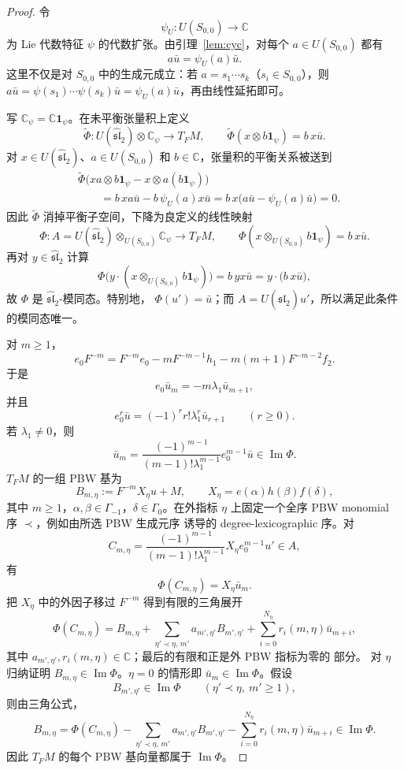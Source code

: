 \documentclass[UTF8,11pt]{ctexart}
\newcommand{\C}{\mathbb C}
\newcommand{\G}{\Gamma}
\newcommand{\slh}{\widehat{\mathfrak{sl}}_2}
\newcommand{\im}{\operatorname{Im}}
\theoremstyle{plain}
\theoremstyle{definition}
\begin{document}
\begin{proof}
令
\[
  \psi_U:U(S_{0,0})\longrightarrow\C
\]
为 Lie 代数特征 \(\psi\) 的代数扩张。由引理~\ref{lem:cyc}，对每个
\(a\in U(S_{0,0})\) 都有
\[
  a\bar u=\psi_U(a)\bar u.
\]
这里不仅是对 \(S_{0,0}\) 中的生成元成立：若
\(a=s_1\cdots s_k\)（\(s_i\in S_{0,0}\)），则
\(a\bar u=\psi(s_1)\cdots\psi(s_k)\bar u=\psi_U(a)\bar u\)，再由线性延拓即可。

写 \(\C_\psi=\C\mathbf 1_\psi\)。在未平衡张量积上定义
\[
  \widetilde\Phi:U(\slh)\otimes\C_\psi\longrightarrow T_FM,
  \qquad
  \widetilde\Phi(x\otimes b\mathbf 1_\psi)=b\,x\bar u.
\]
对 \(x\in U(\slh)\)、\(a\in U(S_{0,0})\) 和 \(b\in\C\)，张量积的平衡关系被送到
\[
\begin{aligned}
  &\widetilde\Phi\bigl(xa\otimes b\mathbf 1_\psi
      -x\otimes a(b\mathbf 1_\psi)\bigr) \\
  &\qquad=b\,xa\bar u-b\,\psi_U(a)x\bar u
   =b\,x\bigl(a\bar u-\psi_U(a)\bar u\bigr)=0.
\end{aligned}
\]
因此 \(\widetilde\Phi\) 消掉平衡子空间，下降为良定义的线性映射
\[
  \Phi:A=U(\slh)\otimes_{U(S_{0,0})}\C_\psi\longrightarrow T_FM,
  \qquad \Phi(x\otimes_{U(S_{0,0})}b\mathbf 1_\psi)=b\,x\bar u.
\]
再对 \(y\in\slh\) 计算
\[
  \Phi\bigl(y\cdot(x\otimes_{U(S_{0,0})}b\mathbf 1_\psi)\bigr)
  =b\,yx\bar u
  =y\cdot\bigl(b\,x\bar u\bigr),
\]
故 \(\Phi\) 是 \(\slh\)-模同态。特别地，
\(\Phi(u')=\bar u\)；而 \(A=U(\slh)u'\)，所以满足此条件的模同态唯一。

对 \(m\ge1\)，
\[
  e_0F^{-m}=F^{-m}e_0-mF^{-m-1}h_1-m(m+1)F^{-m-2}f_2.
\]
于是
\[
  e_0\bar u_m=-m\lambda_1\bar u_{m+1},
\]
并且
\[
  e_0^r\bar u=(-1)^rr!\lambda_1^r\bar u_{r+1}\qquad(r\ge0).
\]
若 \(\lambda_1\ne0\)，则
\[
  \bar u_m=\frac{(-1)^{m-1}}{(m-1)!\lambda_1^{m-1}}e_0^{m-1}\bar u\in\im\Phi.
\]
\(T_FM\) 的一组 PBW 基为
\[
  B_{m,\eta}:=F^{-m}X_\eta u+M,
  \qquad
  X_\eta=e(\alpha)h(\beta)f(\delta),
\]
其中 \(m\ge1\)，\(\alpha,\beta\in\G_{-1}\)，\(\delta\in\G_0\)。在外指标
\(\eta\) 上固定一个全序 PBW monomial 序 \(\prec\)，例如由所选 PBW 生成元序
诱导的 degree-lexicographic 序。对
\[
  C_{m,\eta}=\frac{(-1)^{m-1}}{(m-1)!\lambda_1^{m-1}}X_\eta e_0^{m-1}u'\in A,
\]
有
\[
  \Phi(C_{m,\eta})=X_\eta\bar u_m.
\]
把 \(X_\eta\) 中的外因子移过 \(F^{-m}\) 得到有限的三角展开
\[
  \Phi(C_{m,\eta})
  =
  B_{m,\eta}
  +
  \sum_{\eta'\prec\eta,\,m'}a_{m',\eta'}B_{m',\eta'}
  +
  \sum_{i=0}^{N_\eta}r_i(m,\eta)\bar u_{m+i},
\]
其中 \(a_{m',\eta'},r_i(m,\eta)\in\C\)；最后的有限和正是外 PBW 指标为零的
部分。
对 \(\eta\) 归纳证明 \(B_{m,\eta}\in\im\Phi\)。\(\eta=0\) 的情形即
\(\bar u_m\in\im\Phi\)。假设
\[
  B_{m',\eta'}\in\im\Phi\qquad(\eta'\prec\eta,\ m'\ge1),
\]
则由三角公式，
\[
  B_{m,\eta}
  =
  \Phi(C_{m,\eta})
  -
  \sum_{\eta'\prec\eta,\,m'}a_{m',\eta'}B_{m',\eta'}
  -
  \sum_{i=0}^{N_\eta}r_i(m,\eta)\bar u_{m+i}
  \in\im\Phi.
\]
因此 \(T_FM\) 的每个 PBW 基向量都属于 \(\im\Phi\)。
\end{proof}
\end{document}
